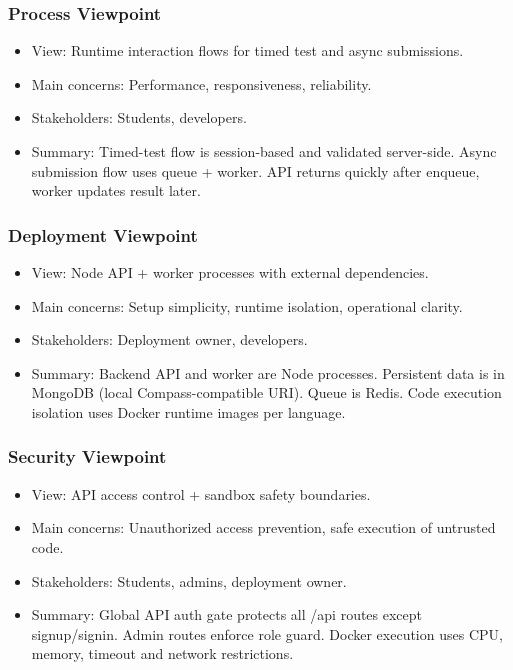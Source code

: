 \documentclass[12pt,journal,onecolumn]{IEEEtran}
\begin{document}
\subsubsection{Process Viewpoint}
\begin{itemize}
    \item View: Runtime interaction flows for timed test and async submissions.
    \item Main concerns: Performance, responsiveness, reliability.
    \item Stakeholders: Students, developers.
    \item Summary: Timed-test flow is session-based and validated server-side. Async submission flow uses queue + worker. API returns quickly after enqueue, worker updates result later.
\end{itemize}

\subsubsection{Deployment Viewpoint}
\begin{itemize}
    \item View: Node API + worker processes with external dependencies.
    \item Main concerns: Setup simplicity, runtime isolation, operational clarity.
    \item Stakeholders: Deployment owner, developers.
    \item Summary: Backend API and worker are Node processes. Persistent data is in MongoDB (local Compass-compatible URI). Queue is Redis. Code execution isolation uses Docker runtime images per language.
\end{itemize}

\subsubsection{Security Viewpoint}
\begin{itemize}
    \item View: API access control + sandbox safety boundaries.
    \item Main concerns: Unauthorized access prevention, safe execution of untrusted code.
    \item Stakeholders: Students, admins, deployment owner.
    \item Summary: Global API auth gate protects all /api routes except signup/signin. Admin routes enforce role guard. Docker execution uses CPU, memory, timeout and network restrictions.
\end{itemize}
\end{document}
